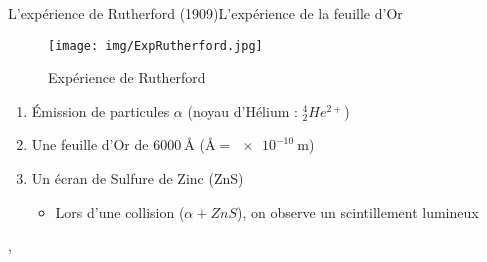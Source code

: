 \documentclass[handout,8pt]{beamer} %
\begin{document}
\begin{frame}{L'expérience de Rutherford (1909)}{L'expérience de la feuille d'Or}
	
	\begin{figure}
		\center
%		
%			
%			
%			
%			
%			
%
		\texttt{[image: img/ExpRutherford.jpg]} 
		\caption{Expérience de Rutherford}
	\end{figure}

	\begin{enumerate}
		\item Émission de particules $\alpha$ (noyau d'Hélium : $^4_2He^{2+}$)
		\item Une feuille d'Or de $\SI{6000}{\angstrom}$ ($\si{\angstrom} = \SI{e-10}{\meter}$)
		\item Un écran de Sulfure de Zinc (ZnS) 
		\begin{itemize}
			\item Lors d'une collision ($\alpha + ZnS$), on observe un scintillement lumineux
		\end{itemize}
	\end{enumerate}
,\end{frame}
\end{document}
